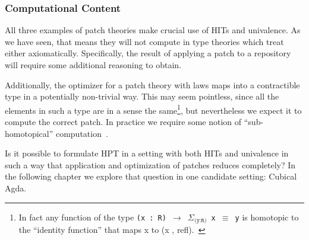 \subsubsection{Computational Content}

All three examples of patch theories make crucial use of HITs and univalence.
As we have seen, that means they will not compute in type theories which treat
either axiomatically. Specifically, the result of applying a patch to a
repository will require some additional reasoning to obtain.

Additionally, the optimizer for a patch theory with laws maps into a
contractible type in a potentially non-trivial way. This may seem pointless, since all the
elements in such a type are in a sense the same\footnote{In fact any
  function of the type \texttt{(x : R) $\rightarrow$ $\Sigma_\texttt{(y:R)}$ x
  $\equiv$ y} is homotopic to the ``identity function'' that maps x to (x ,
refl).~\cite{Angiuli2016}}, but nevertheless we expect it to compute the correct
patch. In practice we require some notion of ``sub-homotopical'' computation~\cite{Angiuli2016}.

Is it possible to formulate HPT in a setting with both HITs and univalence in
such a way that application and optimization of patches reduces completely?
In the following chapter we explore that question in one candidate setting:
Cubical Agda.



